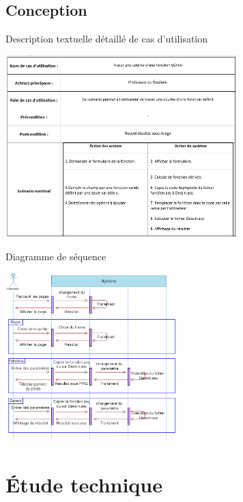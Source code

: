 \documentclass{beamer}
\begin{document}
\subsection{Conception}
\begin{frame}{Description textuelle détaillé de cas d'utilisation}
 \begin{center}
     \includegraphics[width=9cm]{pic/TableDescActi.PNG} 
 \end{center}  
\end{frame}
\begin{frame}{Diagramme de séquence}
\begin{center}
    \includegraphics[width=6.6cm]{pic/DS (1).png}
\end{center}
\end{frame}
\section{Étude technique}
\end{document}
